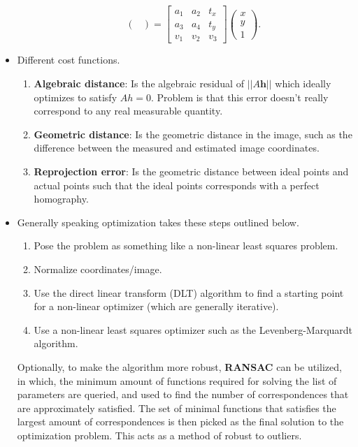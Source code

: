 \documentclass[twocolumn]{article}
\begin{document}
\begin{itemize}
\begin{itemize}
\begin{equation}
\begin{pmatrix}
                \end{pmatrix} =
                \begin{bmatrix}
                     a_1 & a_2 & t_x \\
                     a_3 & a_4 & t_y \\
                     v_1                   & v_2                     & v_3
                \end{bmatrix}\begin{pmatrix}
                    x \\ y \\ 1
                \end{pmatrix}.
            \end{equation}
        \end{itemize}
    \item Different cost functions.
        \begin{enumerate}
            \item \textbf{Algebraic distance}: Is the algebraic residual of $||A\textbf{h}||$ which ideally optimizes to satisfy $Ah = 0$. Problem is that this error doesn't really correspond to any real measurable quantity.
            \item \textbf{Geometric distance}: Is the geometric distance in the image, such as the difference between the measured and estimated image coordinates.
            \item \textbf{Reprojection error}: Is the geometric distance between ideal points and actual points such that the ideal points corresponds with a perfect homography.
        \end{enumerate}
    \item  Generally speaking optimization takes these steps outlined below.
        \begin{enumerate}
            \item Pose the problem as something like a non-linear least squares problem.
            \item Normalize coordinates/image.
            \item Use the direct linear transform (DLT) algorithm to find a starting point for a non-linear optimizer (which are generally iterative).
            \item Use a non-linear least squares optimizer such as the Levenberg-Marquardt algorithm.
        \end{enumerate}
        Optionally, to make the algorithm more robust, \textbf{RANSAC} can be utilized, in which, the minimum amount of functions required for solving the list of parameters are queried, and used to find the number of correspondences that are approximately satisfied. The set of minimal functions that satisfies the largest amount of correspondences is then picked as the final solution to the optimization problem. This acts as a method of robust to outliers.

\end{itemize}
\end{document}
